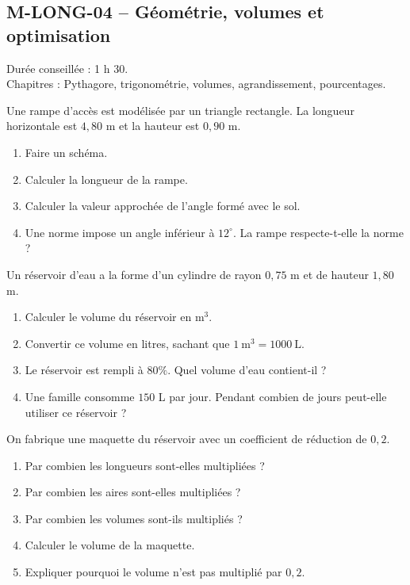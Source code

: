\newpage

\subsection{M-LONG-04 -- Géométrie, volumes et optimisation}

\begin{objectif}
Durée conseillée : 1 h 30.\\
Chapitres : Pythagore, trigonométrie, volumes, agrandissement, pourcentages.
\end{objectif}

\begin{exercice}
Une rampe d'accès est modélisée par un triangle rectangle. La longueur horizontale est $4{,}80$ m et la hauteur est $0{,}90$ m.

\begin{enumerate}
  \item Faire un schéma.
  \item Calculer la longueur de la rampe.
  \item Calculer la valeur approchée de l'angle formé avec le sol.
  \item Une norme impose un angle inférieur à $12^\circ$. La rampe respecte-t-elle la norme ?
\end{enumerate}
\end{exercice}

\begin{exercice}
Un réservoir d'eau a la forme d'un cylindre de rayon $0{,}75$ m et de hauteur $1{,}80$ m.

\begin{enumerate}
  \item Calculer le volume du réservoir en $\mathrm{m^3}$.
  \item Convertir ce volume en litres, sachant que $1\ \mathrm{m^3}=1000\ \mathrm{L}$.
  \item Le réservoir est rempli à $80\%$. Quel volume d'eau contient-il ?
  \item Une famille consomme $150$ L par jour. Pendant combien de jours peut-elle utiliser ce réservoir ?
\end{enumerate}
\end{exercice}

\begin{exercice}
On fabrique une maquette du réservoir avec un coefficient de réduction de $0{,}2$.

\begin{enumerate}
  \item Par combien les longueurs sont-elles multipliées ?
  \item Par combien les aires sont-elles multipliées ?
  \item Par combien les volumes sont-ils multipliés ?
  \item Calculer le volume de la maquette.
  \item Expliquer pourquoi le volume n'est pas multiplié par $0{,}2$.
\end{enumerate}
\end{exercice}


